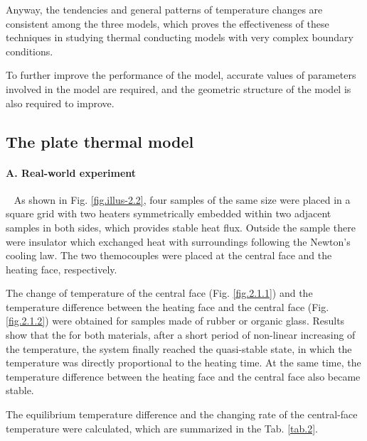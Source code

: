 \documentclass[10pt,a4paper,twocolumn,twoside,UTF8]{article}
\begin{document}
	Anyway, the tendencies and general patterns of temperature changes are consistent among the three models, 
	which proves the effectiveness of these techniques in studying thermal conducting models with very complex boundary conditions.

	To further improve the performance of the model, accurate values of parameters involved in the model are required, and the geometric structure of the model is also required to improve.


		
		
	\subsection{The plate thermal model}
	\paragraph{A. Real-world experiment}~
	\newline 
	\indent
	As shown in Fig. \ref{fig.illus-2.2}, four samples of the same size were placed in a square grid with two heaters symmetrically embedded within two adjacent samples in both sides, which provides stable heat flux. 
	Outside the sample there were insulator which exchanged heat with surroundings following the Newton's cooling law.
	The two themocouples were placed at the central face and the heating face, respectively.

	The change of temperature of the central face (Fig. \ref{fig.2.1.1}) and the temperature difference between the heating face and the central face (Fig. \ref{fig.2.1.2}) were obtained for samples made of rubber or organic glass.
	Results show that the for both materials, after a short period of non-linear increasing of the temperature, the system finally reached the quasi-stable state, in which the temperature was directly proportional to the heating time.
	At the same time, the temperature difference between the heating face and the central face also became stable.

	The equilibrium temperature difference and the changing rate of the central-face temperature were calculated, which are summarized in the Tab. \ref{tab.2}. 
\end{document}
